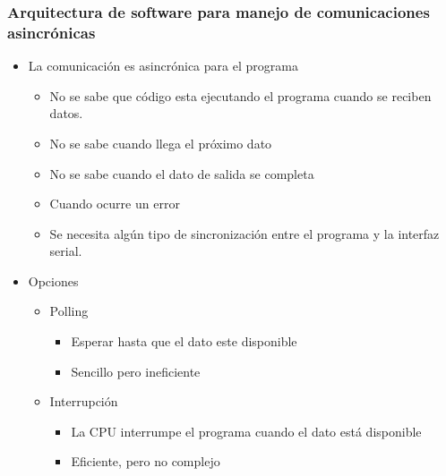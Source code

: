 \documentclass[10.5pt,scale=1.0,t,aspectratio=169,hyperref={pdfpagelabels=false}]{beamer}
\begin{document}
\begin{frame}
	\frametitle{Arquitectura de software para manejo de comunicaciones asincrónicas}
	
	\begin{itemize}
		\item La comunicación es asincrónica para el programa
		\begin{itemize}
			\item No se sabe que código esta ejecutando el programa cuando se reciben datos.
			\item No se sabe cuando llega el próximo dato
			\item No se sabe cuando el dato de salida se completa
			\item Cuando ocurre un error
			\item Se necesita algún tipo de sincronización entre el programa y la interfaz serial. 
		\end{itemize}
		\item Opciones
		\begin{itemize}
			\item Polling
			\begin{itemize}
				\item Esperar hasta que el dato este disponible
				\item Sencillo pero ineficiente
			\end{itemize}
			\item Interrupción
			\begin{itemize}
				\item La CPU interrumpe el programa cuando el dato está disponible
				\item Eficiente, pero no complejo
			\end{itemize}
		\end{itemize}
	\end{itemize}	
\end{frame}
\end{document}
